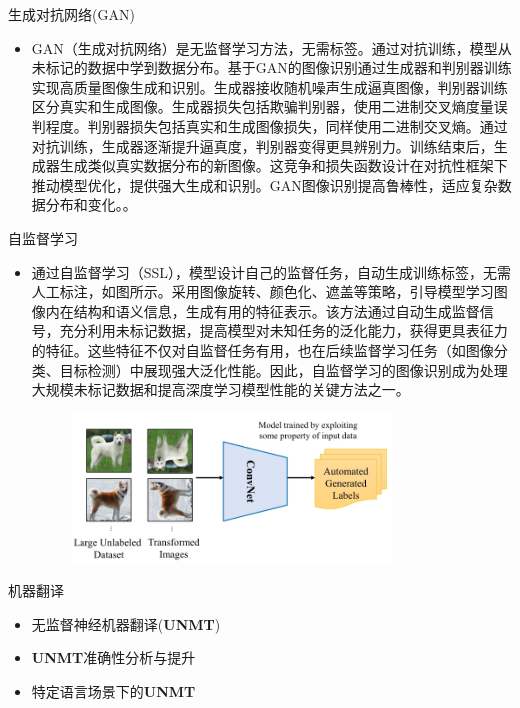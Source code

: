 \documentclass[UTF8]{beamer}
\begin{document}
\begin{frame}{生成对抗网络(GAN)}
    \begin{itemize}
        \item GAN（生成对抗网络）是无监督学习方法，无需标签。通过对抗训练，模型从未标记的数据中学到数据分布。基于GAN的图像识别通过生成器和判别器训练实现高质量图像生成和识别。生成器接收随机噪声生成逼真图像，判别器训练区分真实和生成图像。生成器损失包括欺骗判别器，使用二进制交叉熵度量误判程度。判别器损失包括真实和生成图像损失，同样使用二进制交叉熵。通过对抗训练，生成器逐渐提升逼真度，判别器变得更具辨别力。训练结束后，生成器生成类似真实数据分布的新图像。这竞争和损失函数设计在对抗性框架下推动模型优化，提供强大生成和识别。GAN图像识别提高鲁棒性，适应复杂数据分布和变化。。
    \end{itemize}
\end{frame}

\begin{frame}{自监督学习}
    \scriptsize
    \begin{itemize}
        \item 通过自监督学习（SSL），模型设计自己的监督任务，自动生成训练标签，无需人工标注，如图所示。采用图像旋转、颜色化、遮盖等策略，引导模型学习图像内在结构和语义信息，生成有用的特征表示。该方法通过自动生成监督信号，充分利用未标记数据，提高模型对未知任务的泛化能力，获得更具表征力的特征。这些特征不仅对自监督任务有用，也在后续监督学习任务（如图像分类、目标检测）中展现强大泛化性能。因此，自监督学习的图像识别成为处理大规模未标记数据和提高深度学习模型性能的关键方法之一。

        \begin{figure}[H]
            \centering
            \includegraphics[width=0.8\textwidth]{img//2-Image Recognition/2.jpg}
        \end{figure}
    \end{itemize}
\end{frame}

\begin{frame}{机器翻译}
    \begin{itemize}
        \item 无监督神经机器翻译(\textbf{UNMT})
        \item \textbf{UNMT}准确性分析与提升
        \item 特定语言场景下的\textbf{UNMT}
    \end{itemize}
\end{frame}
\end{document}

